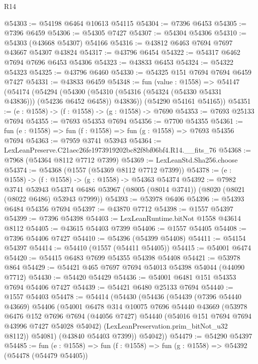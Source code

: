 \begin{lexlean}{R14}
\begin{coremodule}
@54303 := @54198 @6464 @10613 @54115
@54304 := @7396 @6453
@54305 := @7396 @6459
@54306 := @54305 @7427
@54307 := @54304 @54306
@54310 := @54303 (@43668 @54307) @54166
@54316 := @43812 @6463 @7694 @7697 @43667 @54307 @43824
@54317 := @43796 @6454
@54322 := @54317 @6462 @7694 @7696 @6453 @54306
@54323 := @43833 @6453
@54324 := @54322 @54323
@54325 := @43796 @6460
@54330 := @54325 @151 @7694 @7694 @6459 @7427
@54331 := @43833 @6459
@54348 := fun (value : @1558) =>
  @54147
    (@54174
      (@54294
        (@54300 (@54310 (@54316 (@54324 (@54330 @54331 @43836))) (@54236 @6452 @6458)) @43836))
      (@54290 @54161 @54165))
@54351 := (e : @1558) -> (f : @1558) -> (g : @1558) -> @7690
@54353 := @7693 @25133 @7694
@54355 := @7693 @54353 @7694
@54356 := @7700 @54355
@54361 := fun (e : @1558) => fun (f : @1558) => fun (g : @1558) => @7693 @54356 @7694
@54363 := @7959 @3741 @53943
@54364 := LexLeanPreserve.C21aec26fe1973919202bc82f8bf06bf4.R14.__fits_76
@54368 := @7968 (@54364 @8112 @7712 @7399)
@54369 := LexLeanStd.Sha256.choose
@54374 := @54368 (@1557 (@54369 @8112 @7712 @7399))
@54378 := (e : @1558) -> (f : @1558) -> (g : @1558) -> @54363 @54374
@54392 := @7982
    @3741
    @53943
    @54374
    @6486
    @53967
    (@8005 (@8014 @3741))
    (@8020 (@8021 (@8022 @6486) @53943 @7999))
@54393 := @53978 @6406
@54396 := @54393 @6484 @54356 @7694
@54397 := @43870 @7712
@54398 := @1557 @54397
@54399 := @7396 @54398
@54403 := LexLeanRuntime.bitNot @1558 @43614 @8112
@54405 := @43615 @54403 @7399
@54406 := @1557 @54405
@54408 := @7396 @54406 @7427
@54410 := @54396 (@54399 @54408)
@54411 := @54154 @54397
@54414 := @54410 (@1557 (@54411 @54405))
@54415 := @54001 @6474
@54420 := @54415 @6483 @7699 @54355 @54398 @54408
@54421 := @53978 @864
@54429 := @54421 @465 @7697 @7694 @54013 @54398 @54044 (@44090 @7712)
@54430 := @54420 @54429
@54436 := @54001 @6481 @151 @54353 @7694 @54406 @7427
@54439 := @54421 @6480 @25133 @7694
@54440 := @1557 @54403
@54478 := @54414
    (@54430
      (@54436
        (@54439
          (@7396 @54440 @43669)
          @54406
          (@54001
            @6478
            @314
            @10075
            @7696
            @54440
            @43669
            (@53978
              @6476
              @152
              @7696
              @7694
              (@44056 @7427)
              @54440
              (@54016 @151 @7694 @7694 @43996 @7427 @54028 @54042)
              (LexLeanPreservation.prim_bitNot_u32 @8112))
            @54081)
          (@43840 @54403 @7399))
        @54042))
@54479 := @54290 @54397
@54485 := fun (e : @1558) => fun (f : @1558) => fun (g : @1558) => @54392 (@54478 (@54479 @54405))

\end{coremodule}
\end{lexlean}
